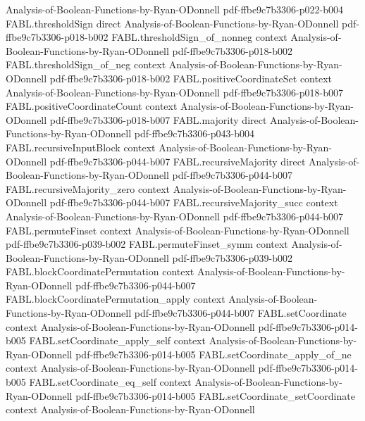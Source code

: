\begin{theorem}
  {Analysis-of-Boolean-Functions-by-Ryan-ODonnell}
  {pdf-ffbe9c7b3306-p022-b004}
\proofstep
  {FABL.thresholdSign}
  {direct}
  {Analysis-of-Boolean-Functions-by-Ryan-ODonnell}
  {pdf-ffbe9c7b3306-p018-b002}
\proofstep
  {FABL.thresholdSign_of_nonneg}
  {context}
  {Analysis-of-Boolean-Functions-by-Ryan-ODonnell}
  {pdf-ffbe9c7b3306-p018-b002}
\proofstep
  {FABL.thresholdSign_of_neg}
  {context}
  {Analysis-of-Boolean-Functions-by-Ryan-ODonnell}
  {pdf-ffbe9c7b3306-p018-b002}
\proofstep
  {FABL.positiveCoordinateSet}
  {context}
  {Analysis-of-Boolean-Functions-by-Ryan-ODonnell}
  {pdf-ffbe9c7b3306-p018-b007}
\proofstep
  {FABL.positiveCoordinateCount}
  {context}
  {Analysis-of-Boolean-Functions-by-Ryan-ODonnell}
  {pdf-ffbe9c7b3306-p018-b007}
\proofstep
  {FABL.majority}
  {direct}
  {Analysis-of-Boolean-Functions-by-Ryan-ODonnell}
  {pdf-ffbe9c7b3306-p043-b004}
\proofstep
  {FABL.recursiveInputBlock}
  {context}
  {Analysis-of-Boolean-Functions-by-Ryan-ODonnell}
  {pdf-ffbe9c7b3306-p044-b007}
\proofstep
  {FABL.recursiveMajority}
  {direct}
  {Analysis-of-Boolean-Functions-by-Ryan-ODonnell}
  {pdf-ffbe9c7b3306-p044-b007}
\proofstep
  {FABL.recursiveMajority_zero}
  {context}
  {Analysis-of-Boolean-Functions-by-Ryan-ODonnell}
  {pdf-ffbe9c7b3306-p044-b007}
\proofstep
  {FABL.recursiveMajority_succ}
  {context}
  {Analysis-of-Boolean-Functions-by-Ryan-ODonnell}
  {pdf-ffbe9c7b3306-p044-b007}
\proofstep
  {FABL.permuteFinset}
  {context}
  {Analysis-of-Boolean-Functions-by-Ryan-ODonnell}
  {pdf-ffbe9c7b3306-p039-b002}
\proofstep
  {FABL.permuteFinset_symm}
  {context}
  {Analysis-of-Boolean-Functions-by-Ryan-ODonnell}
  {pdf-ffbe9c7b3306-p039-b002}
\proofstep
  {FABL.blockCoordinatePermutation}
  {context}
  {Analysis-of-Boolean-Functions-by-Ryan-ODonnell}
  {pdf-ffbe9c7b3306-p044-b007}
\proofstep
  {FABL.blockCoordinatePermutation_apply}
  {context}
  {Analysis-of-Boolean-Functions-by-Ryan-ODonnell}
  {pdf-ffbe9c7b3306-p044-b007}
\proofstep
  {FABL.setCoordinate}
  {context}
  {Analysis-of-Boolean-Functions-by-Ryan-ODonnell}
  {pdf-ffbe9c7b3306-p014-b005}
\proofstep
  {FABL.setCoordinate_apply_self}
  {context}
  {Analysis-of-Boolean-Functions-by-Ryan-ODonnell}
  {pdf-ffbe9c7b3306-p014-b005}
\proofstep
  {FABL.setCoordinate_apply_of_ne}
  {context}
  {Analysis-of-Boolean-Functions-by-Ryan-ODonnell}
  {pdf-ffbe9c7b3306-p014-b005}
\proofstep
  {FABL.setCoordinate_eq_self}
  {context}
  {Analysis-of-Boolean-Functions-by-Ryan-ODonnell}
  {pdf-ffbe9c7b3306-p014-b005}
\proofstep
  {FABL.setCoordinate_setCoordinate}
  {context}
  {Analysis-of-Boolean-Functions-by-Ryan-ODonnell}

\end{theorem}
